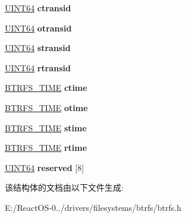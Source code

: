 \begin{DoxyCompactItemize}
\item 
\mbox{\label{struct_r_o_o_t___i_t_e_m_ad4d32dcfc936c78f7439de655284089d}} 
\hyperlink{_processor_bind_8h_a57be03562867144161c1bfee95ca8f7c}{U\+I\+N\+T64} {\bfseries ctransid}
\item 
\mbox{\label{struct_r_o_o_t___i_t_e_m_a32a3460777e89fa2b7552daaeff6f452}} 
\hyperlink{_processor_bind_8h_a57be03562867144161c1bfee95ca8f7c}{U\+I\+N\+T64} {\bfseries otransid}
\item 
\mbox{\label{struct_r_o_o_t___i_t_e_m_a5f072b42d440fe6dc0e0ae23094c8bce}} 
\hyperlink{_processor_bind_8h_a57be03562867144161c1bfee95ca8f7c}{U\+I\+N\+T64} {\bfseries stransid}
\item 
\mbox{\label{struct_r_o_o_t___i_t_e_m_a0dee82e39818d41d7a7b939625759784}} 
\hyperlink{_processor_bind_8h_a57be03562867144161c1bfee95ca8f7c}{U\+I\+N\+T64} {\bfseries rtransid}
\item 
\mbox{\label{struct_r_o_o_t___i_t_e_m_a75c75283ad0852dd34865dfc07528e35}} 
\hyperlink{struct_b_t_r_f_s___t_i_m_e}{B\+T\+R\+F\+S\+\_\+\+T\+I\+ME} {\bfseries ctime}
\item 
\mbox{\label{struct_r_o_o_t___i_t_e_m_adc89c3e3eb5d29e11aa9be5b0bfa0953}} 
\hyperlink{struct_b_t_r_f_s___t_i_m_e}{B\+T\+R\+F\+S\+\_\+\+T\+I\+ME} {\bfseries otime}
\item 
\mbox{\label{struct_r_o_o_t___i_t_e_m_ab2a96b5354d6af7b1b43e04ef6c1a1ae}} 
\hyperlink{struct_b_t_r_f_s___t_i_m_e}{B\+T\+R\+F\+S\+\_\+\+T\+I\+ME} {\bfseries stime}
\item 
\mbox{\label{struct_r_o_o_t___i_t_e_m_a9fa9f2678d60d078c365404e85682b73}} 
\hyperlink{struct_b_t_r_f_s___t_i_m_e}{B\+T\+R\+F\+S\+\_\+\+T\+I\+ME} {\bfseries rtime}
\item 
\mbox{\label{struct_r_o_o_t___i_t_e_m_ac94bfca528ccdace12c3b9ecd2234c53}} 
\hyperlink{_processor_bind_8h_a57be03562867144161c1bfee95ca8f7c}{U\+I\+N\+T64} {\bfseries reserved} \mbox{[}8\mbox{]}
\end{DoxyCompactItemize}


该结构体的文档由以下文件生成\+:\begin{DoxyCompactItemize}
\item 
E\+:/\+React\+O\+S-\/0../drivers/filesystems/btrfs/btrfs.\+h\end{DoxyCompactItemize}
